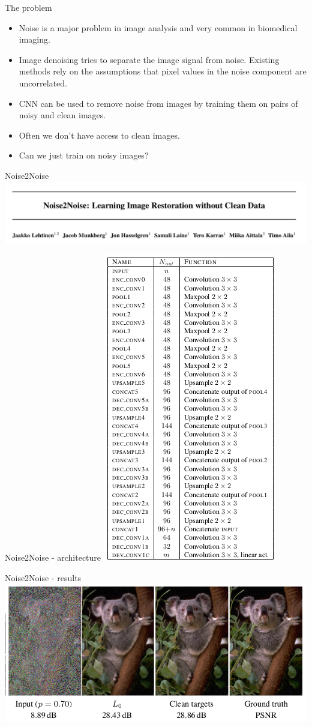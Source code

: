 \documentclass[9pt, aspectratio=169]{beamer}
\begin{document}
\begin{frame}
    {The problem}
    \begin{itemize}
        \item Noise is a major problem in image analysis and very common in biomedical imaging.
        \item Image denoising tries to separate the image signal from noise. Existing methods rely on the assumptions that pixel values in the noise component are uncorrelated.
        \item CNN can be used to remove noise from images by training them on pairs of noisy and clean images.
        \item Often we don't have access to clean images.
        \item Can we just train on noisy images?
    \end{itemize}
\end{frame}

\begin{frame}
    {Noise2Noise}
    \centering
    \includegraphics[width=\textwidth]{Noise2Noise_title.png}
\end{frame}

\begin{frame}
    {Noise2Noise - architecture}
    \centering
    \includegraphics[width=.3\textwidth]{noise2noise_architecture.png}
\end{frame}

\begin{frame}
    {Noise2Noise - results}
    \includegraphics[width=\textwidth]{noise2noise_results.png}
\end{frame}
\end{document}
